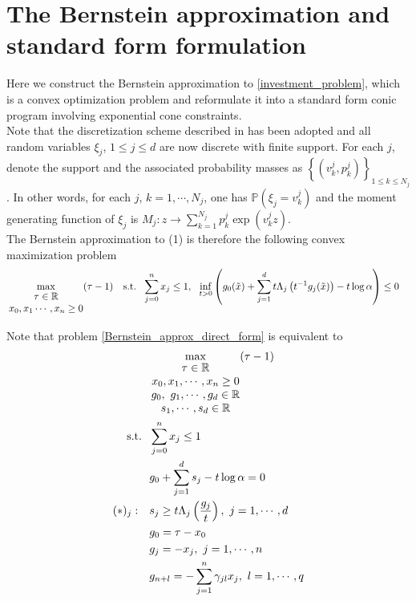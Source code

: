 \documentclass[11pt]{article}
\begin{document}
\section*{The Bernstein approximation and standard form formulation}
Here we construct the Bernstein approximation to \eqref{investment_problem}, which is a convex optimization problem and reformulate it into a standard form conic program involving exponential cone constraints. \\

Note that the discretization scheme described in \cite{Nemirovsky_and_Shapiro} has been adopted and all random variables $\xi_j$, $1\leq j \leq d$ are now discrete with finite support. For each $j$, denote the support and the associated probability masses as $\left\{(v_k^j, p_k^j)\right\}_{1\leq k \leq N_j}$. In other words, for each $j$, $k=1, \cdots, N_j$, one has $\mathbb{P}\left(\xi_j = v_k^j\right)$ and the moment generating function of $\xi_j$ is $M_j: z \rightarrow \sum_{k=1}^{N_j} p_k^j \exp \left(v_k^j z\right)$.\\

The Bernstein approximation to (1) is therefore the following convex maximization problem
\begin{align} \label{Bernstein_approx_direct_form}
\begin{split}
&\max_{\begin{matrix}
	\tau \in \mathbb{R}\\ 	
	x_0, x_1\cdots,x_n \geq 0
	\end{matrix}} (\tau - 1)\ \ \
\textnormal{s.t.}\ \ \sum_{j=0}^n x_j \leq 1,\ \ \inf_{t>0} \left(g_0(\tilde{x}) + \sum_{j=1}^d t \Lambda_j\left(t^{-1}g_j(\tilde{x})\right) - t\log \alpha \right) \leq 0
\end{split}
\end{align}

Note that problem \eqref{Bernstein_approx_direct_form} is equivalent to
\begin{align}\label{Bernstein_approx_eq_form_1}
\begin{split}
&\max_{\begin{matrix}
	\tau \in \mathbb{R} \\ 
	x_0, x_1, \cdots, x_n \geq 0\\
	g_0,\ g_1, \cdots, g_d \in \mathbb{R}\\
	s_1, \cdots, s_d \in \mathbb{R}
	\end{matrix}} (\tau - 1)\\ \textnormal{s.t.}\ \ & \sum_{j=0}^n x_j \leq 1\\
&g_0 + \sum_{j=1}^d s_j - t\log \alpha = 0 \\
{(*)_j}:\ \ \ & s_j \geq t \Lambda_j\left(\dfrac{g_j}{t}\right),\ j=1, \cdots, d\ \ \ \\
& g_0 = \tau - x_0 \\
& g_j = -x_j,\ j = 1, \cdots, n \\
& g_{n+l} = -\sum_{j=1}^n \gamma_{jl}x_j,\ l=1,\cdots, q
\end{split}
\end{align}
\end{document}
